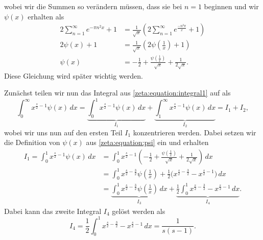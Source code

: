 wobei wir die Summen so verändern müssen, dass sie bei $n=1$ beginnen und wir $\psi(x)$ erhalten als
\begin{align}
    2
    \sum_{n=1}^{\infty}
    e^{-\pi n^2 x}
    +
    1
    &=
    \frac{1}{\sqrt{x}}
    \left(
    2
    \sum_{n=1}^{\infty}
    e^{\frac{-n^2 \pi}{x}}
    +
    1
    \right)
    \\
    2
    \psi(x)
    +
    1
    &=
    \frac{1}{\sqrt{x}}
    \left(
    2
    \psi\left(\frac{1}{x}\right)
    +
    1
    \right)
    \\
    \psi(x)
    &=
    - \frac{1}{2}
    + \frac{\psi\left(\frac{1}{x} \right)}{\sqrt{x}}
    + \frac{1}{2 \sqrt{x}}.\label{zeta:equation:psi}
\end{align}
Diese Gleichung wird später wichtig werden.

Zunächst teilen wir nun das Integral aus \eqref{zeta:equation:integral1} auf als
\begin{equation}\label{zeta:equation:integral2}
    \int_0^{\infty}
    x^{\frac{s}{2}-1}
    \psi(x)
    \,dx
    =
    \underbrace{
    \int_0^{1}
    x^{\frac{s}{2}-1}
    \psi(x)
    \,dx
    }_{I_1}
    +
    \underbrace{
    \int_1^{\infty}
    x^{\frac{s}{2}-1}
    \psi(x)
    \,dx
    }_{I_2}
    =
    I_1 + I_2,
\end{equation}
wobei wir uns nun auf den ersten Teil $I_1$ konzentrieren werden.
Dabei setzen wir die Definition von $\psi(x)$ aus \eqref{zeta:equation:psi} ein und erhalten
\begin{align}
    I_1
    =
    \int_0^{1}
    x^{\frac{s}{2}-1}
    \psi(x)
    \,dx
    &=
    \int_0^{1}
    x^{\frac{s}{2}-1}
    \left(
    - \frac{1}{2}
    + \frac{\psi\left(\frac{1}{x} \right)}{\sqrt{x}}
    + \frac{1}{2 \sqrt{x}}
    \right)
    \,dx
    \\
    &=
    \int_0^{1}
    x^{\frac{s}{2}-\frac{3}{2}}
    \psi \left( \frac{1}{x} \right)
    + \frac{1}{2}
    \biggl(
    x^{\frac{s}{2}-\frac{3}{2}}
    -
    x^{\frac{s}{2}-1}
    \biggl)
    \,dx
    \\
    &=
    \underbrace{
    \int_0^{1}
    x^{\frac{s}{2}-\frac{3}{2}}
    \psi \left( \frac{1}{x} \right)
    \,dx
    }_{I_3}
    +
    \underbrace{
    \frac{1}{2}
    \int_0^1
    x^{\frac{s}{2}-\frac{3}{2}}
    -
    x^{\frac{s}{2}-1}
    \,dx
    }_{I_4}. \label{zeta:equation:integral3}
\end{align}
Dabei kann das zweite Integral $I_4$ gelöst werden als
\begin{equation}
    I_4
    =
    \frac{1}{2}
    \int_0^1
    x^{\frac{s}{2}-\frac{3}{2}}
    -
    x^{\frac{s}{2}-1}
    \,dx
    =
    \frac{1}{s(s-1)}.
\end{equation}
